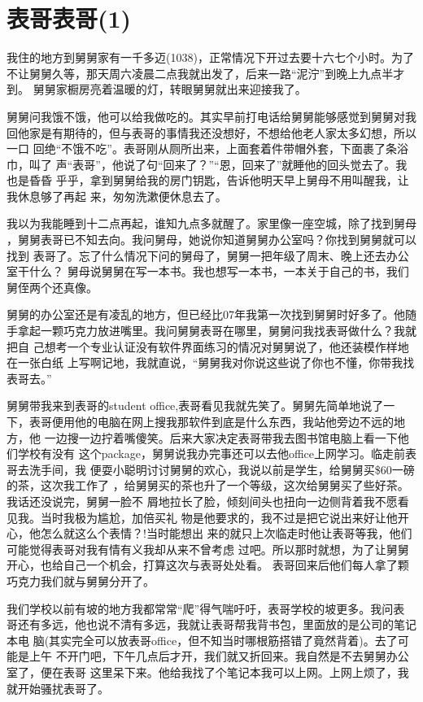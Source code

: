 \documentclass[12pt]{book}
\begin{document}
\section{表哥表哥(1)}
\label{sec-7-3}

        我住的地方到舅舅家有一千多迈(1038)，正常情况下开过去要十六七个小时。为了
不让舅舅久等，那天周六凌晨二点我就出发了，后来一路“泥泞”到晚上九点半才到。
舅舅家橱房亮着温暖的灯，转眼舅舅就出来迎接我了。

        舅舅问我饿不饿，他可以给我做吃的。其实早前打电话给舅舅能够感觉到舅舅对我
回他家是有期待的，但与表哥的事情我还没想好，不想给他老人家太多幻想，所以一口
回绝“不饿不吃”。表哥刚从厕所出来，上面套着件带帽外套，下面裹了条浴巾，叫了
声“表哥”，他说了句“回来了？”“恩，回来了”就睡他的回头觉去了。我也是昏昏
乎乎，拿到舅舅给我的房门钥匙，告诉他明天早上舅母不用叫醒我，让我休息够了再起
来，匆匆洗漱便休息去了。

        我以为我能睡到十二点再起，谁知九点多就醒了。家里像一座空城，除了找到舅母
，舅舅表哥已不知去向。我问舅母，她说你知道舅舅办公室吗？你找到舅舅就可以找到
表哥了。忘了什么情况下问的舅母了，舅舅一把年级了周末、晚上还去办公室干什么？
舅母说舅舅在写一本书。我也想写一本书，一本关于自己的书，我们舅侄两个还真像。

        舅舅的办公室还是有凌乱的地方，但已经比07年我第一次找到舅舅时好多了。他随
手拿起一颗巧克力放进嘴里。我问舅舅表哥在哪里，舅舅问我找表哥做什么？我就把自
己想考一个专业认证没有软件界面练习的情况对舅舅说了，他还装模作样地在一张白纸
上写啊记地，我就直说，“舅舅我对你说这些说了你也不懂，你带我找表哥去。”

        舅舅带我来到表哥的student office,表哥看见我就先笑了。舅舅先简单地说了一
下，表哥便用他的电脑在网上搜我那软件到底是什么东西，我站他旁边不远的地方，他
一边搜一边拧着嘴傻笑。后来大家决定表哥带我去图书馆电脑上看一下他们学校有没有
这个package，舅舅说我办完事还可以去他office上网学习。临走前表哥去洗手间，我
便耍小聪明讨讨舅舅的欢心，我说以前是学生，给舅舅买\$60一磅的茶，这次我工作了
，给舅舅买的茶也升了一个等级，这次给舅舅买了些好茶。我话还没说完，舅舅一脸不
屑地拉长了脸，倾刻间头也扭向一边侧背着我不愿看见我。当时我极为尴尬，加倍买礼
物是他要求的，我不过是把它说出来好让他开心，他怎么就这么个表情？!当时能想出
来的就只上次临走时他让表哥等我，他们可能觉得表哥对我有情有义我却从来不曾考虑
过吧。所以那时就想，为了让舅舅开心，也给自己一个机会，打算这次与表哥处处看。
表哥回来后他们每人拿了颗巧克力我们就与舅舅分开了。

        我们学校以前有坡的地方我都常常“爬”得气喘吁吁，表哥学校的坡更多。我问表
哥还有多远，他也说不清有多远，我就让表哥帮我背书包，里面放的是公司的笔记本电
脑(其实完全可以放表哥office，但不知当时哪根筋搭错了竟然背着)。去了可能是上午
不开门吧，下午几点后才开，我们就又折回来。我自然是不去舅舅办公室了，便在表哥
这里呆下来。他给我找了个笔记本我可以上网。上网上烦了，我就开始骚扰表哥了。
\end{document}
